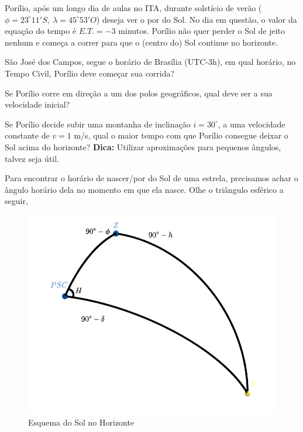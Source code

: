 \documentclass[11pt]{article}
\begin{document}
    
\begin{pproblem}
    Porílio, após um longo dia de aulas no ITA, durante solstício de verão (\(\phi = 23^\circ 11' S, \ \lambda = 45^\circ 53' O\)) deseja ver o por do Sol. No dia em questão, o valor da equação do tempo é \(E.T. = -3\) minutos. Porílio não quer perder o Sol de jeito nenhum e começa a correr para que o (centro do) Sol continue no horizonte.

    \begin{alternativas}
        \item São José dos Campos, segue o horário de Brasília (UTC-3h), em qual horário, no Tempo Civil, Porílio deve começar sua corrida?
        \item Se Porílio corre em direção a um dos polos geográficos, qual deve ser a sua velocidade inicial?
        \item Se Porílio decide subir uma montanha de inclinação \(i = 30^\circ\), a uma velocidade constante de \(v = 1\) m/s, qual o maior tempo com que Porílio consegue deixar o Sol acima do horizonte?
        \textbf{Dica: } Utilizar aproximações para pequenos ângulos, talvez seja útil.
    \end{alternativas}

\begin{pssolution*}{}{ }
    \begin{alternativas}
        \item Para encontrar o horário de nascer/por do Sol de uma estrela, precisamos achar o ângulo horário dela no momento em que ela nasce. Olhe o triângulo esférico a seguir, 
        
        \begin{figure}[H]
            \centering
            \includegraphics[width=0.8\linewidth]{imagens/trigangulohorario.png}
            \caption{Esquema do Sol no Horizonte}
        \end{figure}


\end{alternativas}
\end{pssolution*}
\end{pproblem}
\end{document}
